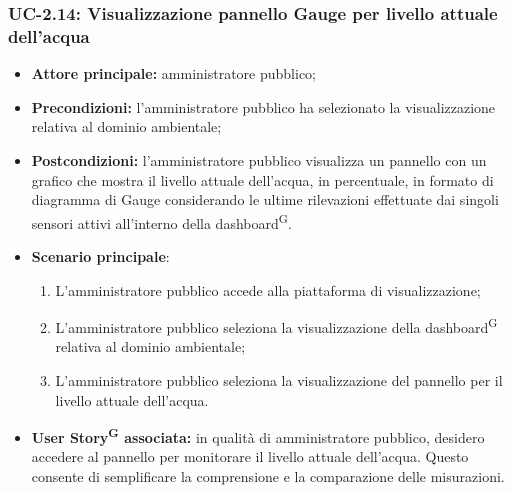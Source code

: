 \documentclass[8pt]{article}
\newcommand{\glossterm}[1]{#1\textsuperscript{G}} %
\begin{document}
\subsubsection*{UC-2.14: Visualizzazione pannello Gauge per livello attuale dell'acqua}
\begin{itemize}
    \item \textbf{Attore principale:} amministratore pubblico;
    \item \textbf{Precondizioni:} l'amministratore pubblico ha selezionato la visualizzazione
        relativa al dominio ambientale;
    \item \textbf{Postcondizioni:} l'amministratore pubblico visualizza un pannello con un grafico che mostra il livello attuale dell'acqua, in percentuale, in formato di diagramma di Gauge considerando le ultime rilevazioni effettuate dai singoli sensori attivi all'interno della \glossterm{dashboard}.
    \item \textbf{Scenario principale}:
    \begin{enumerate}
    \item L'amministratore pubblico accede alla piattaforma di visualizzazione;
    \item L'amministratore pubblico seleziona la visualizzazione della \glossterm{dashboard} relativa al dominio
        ambientale; 
    \item L'amministratore pubblico seleziona la visualizzazione del pannello per il livello attuale dell'acqua.
    \end{enumerate}
\item \textbf{\glossterm{User Story} associata:} in qualità di amministratore pubblico, desidero accedere al pannello per monitorare il livello attuale dell'acqua. Questo consente di semplificare la comprensione e la comparazione delle misurazioni.
\end{itemize}
\end{document}
